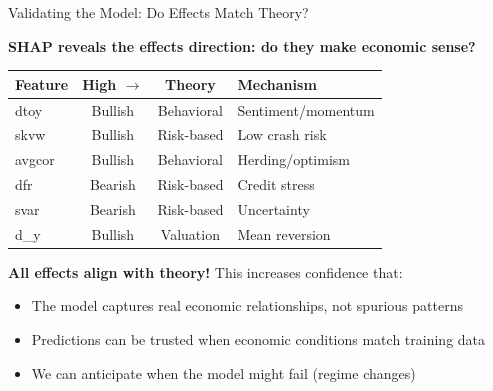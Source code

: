 \documentclass[10pt]{beamer}
\newcommand{\highlight}[1]{\textcolor{AccentOrange}{\textbf{#1}}}
\begin{document}

\begin{frame}{Validating the Model: Do Effects Match Theory?}

  \highlight{SHAP reveals the effects direction: do they make economic sense?}

  \vspace{0.3em}
  \begin{center}
  \begin{tabular}{lccp{3.5cm}}
    \toprule
    \textbf{Feature} & \textbf{High $\rightarrow$} & \textbf{Theory} & \textbf{Mechanism} \\
    \midrule
    dtoy & Bullish & Behavioral & Sentiment/momentum \\
    skvw & Bullish & Risk-based & Low crash risk \\
    avgcor & Bullish & Behavioral & Herding/optimism \\
    dfr & Bearish & Risk-based & Credit stress \\
    svar & Bearish & Risk-based & Uncertainty \\
    d\_y & Bullish & Valuation & Mean reversion \\
    \bottomrule
  \end{tabular}
  \end{center}

  \vspace{0.3em}
  \textbf{All effects align with theory!} This increases confidence that:
  \begin{itemize}
    \item The model captures real economic relationships, not spurious patterns
    \item Predictions can be trusted when economic conditions match training data
    \item We can anticipate when the model might fail (regime changes)
  \end{itemize}
\end{frame}

\end{document}
